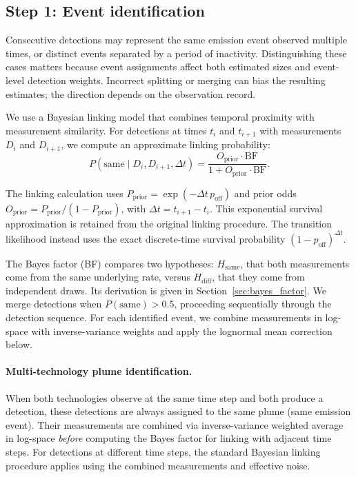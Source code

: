 \documentclass[11pt]{article}
\begin{document}
\subsection{Step 1: Event identification}

Consecutive detections may represent the same emission event observed multiple times, or distinct events separated by a period of inactivity. Distinguishing these cases matters because event assignments affect both estimated sizes and event-level detection weights. Incorrect splitting or merging can bias the resulting estimates; the direction depends on the observation record.

We use a Bayesian linking model that combines temporal proximity with measurement similarity. For detections at times $t_i$ and $t_{i+1}$ with measurements $D_i$ and $D_{i+1}$, we compute an approximate linking probability:
\begin{equation}
    P(\text{same} \mid D_i, D_{i+1}, \Delta t) = \frac{O_{\text{prior}} \cdot \text{BF}}{1 + O_{\text{prior}} \cdot \text{BF}}.
\end{equation}

The linking calculation uses $P_{\text{prior}}=\exp(-\Delta t\,p_{\text{off}})$ and prior odds $O_{\text{prior}}=P_{\text{prior}}/(1-P_{\text{prior}})$, with $\Delta t=t_{i+1}-t_i$. This exponential survival approximation is retained from the original linking procedure. The transition likelihood instead uses the exact discrete-time survival probability $(1-p_{\text{off}})^{\Delta t}$.

The Bayes factor (BF) compares two hypotheses: $H_{\text{same}}$, that both measurements come from the same underlying rate, versus $H_{\text{diff}}$, that they come from independent draws. Its derivation is given in Section~\ref{sec:bayes_factor}. We merge detections when $P(\text{same}) > 0.5$, proceeding sequentially through the detection sequence. For each identified event, we combine measurements in log-space with inverse-variance weights and apply the lognormal mean correction below.

\paragraph{Multi-technology plume identification.}
When both technologies observe at the same time step and both produce a detection, these detections are always assigned to the same plume (same emission event). Their measurements are combined via inverse-variance weighted average in log-space \emph{before} computing the Bayes factor for linking with adjacent time steps. For detections at different time steps, the standard Bayesian linking procedure applies using the combined measurements and effective noise.
\end{document}
